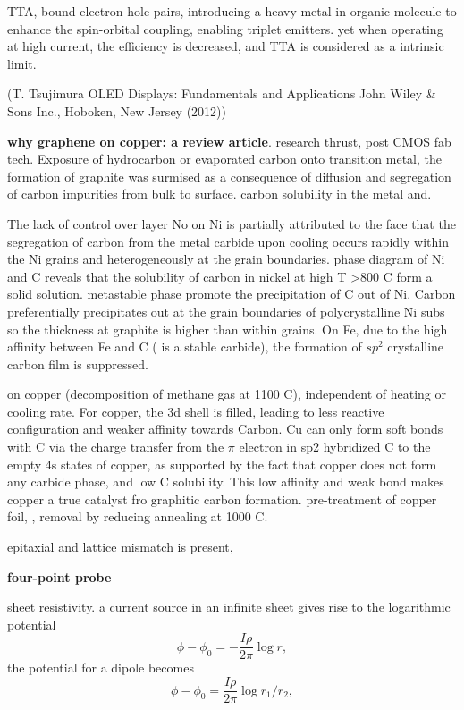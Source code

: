 TTA, bound electron-hole pairs, introducing a heavy metal in organic molecule to enhance the spin-orbital coupling, enabling triplet emitters.\cite{Zhang2013i} yet when operating at high current, the efficiency is decreased, and TTA is considered as a intrinsic limit.


(T. Tsujimura OLED Displays: Fundamentals and Applications John Wiley \& Sons Inc., Hoboken, New Jersey (2012))


\textbf{why graphene on copper: a review article}. \cite{Mattevi2011} research thrust, post CMOS fab tech. Exposure of hydrocarbon or evaporated carbon onto transition metal, the formation of graphite was surmised as a consequence of diffusion and segregation of carbon impurities from bulk to surface. carbon solubility in the metal and. 

The lack of control over layer No on Ni is partially attributed to the face that the segregation of carbon from the metal carbide upon cooling occurs rapidly within the Ni grains and heterogeneously at the grain boundaries. phase diagram of Ni and C reveals that the solubility of carbon in nickel at high T \textgreater 800 C form a solid solution. metastable phase  promote the precipitation of C out of Ni. Carbon preferentially precipitates out at the grain boundaries of polycrystalline Ni subs so the thickness at graphite is higher than within grains. On Fe, due to the high affinity between Fe and C ( is a stable carbide), the formation of $sp^2$ crystalline carbon film is suppressed. 

on copper (decomposition of methane gas at 1100 C), independent of heating or cooling rate. For copper, the 3d shell is filled, leading to less reactive configuration and weaker affinity towards Carbon. Cu can only form soft bonds with C via the charge transfer from the $\pi$ electron in  sp2 hybridized C to the empty 4s states of copper, as supported by the fact that copper does not form any carbide phase, and low C solubility. This low affinity and weak bond makes copper a true catalyst fro graphitic carbon formation. pre-treatment of copper foil, ,  removal by reducing annealing at 1000 C. 

epitaxial and lattice mismatch is present, 

\textbf{four-point probe}

sheet resistivity. a current source in an infinite sheet gives rise to the logarithmic potential
\[
\phi - \phi_0 = - \frac{I\rho}{2\pi}\log r,
\]
the potential for a dipole becomes
\[
\phi - \phi_0 = \frac{I\rho}{2\pi}\log r_1/r_2,
\]

